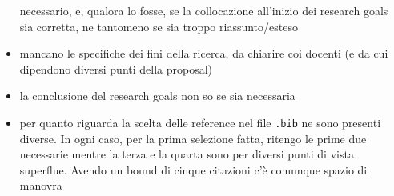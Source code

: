\documentclass[a4paper,11pt, oneside]{article}
\begin{document}
\begin{shaded}
\begin{itemize}
    necessario, e, qualora lo fosse, se la collocazione all'inizio dei research
    goals sia corretta, ne tantomeno se sia troppo riassunto/esteso
    \item mancano le specifiche dei fini della ricerca, da chiarire coi docenti
    (e da cui dipendono diversi punti della proposal)
    \item la conclusione del research goals non so se sia necessaria
    \item per quanto riguarda la scelta delle reference nel file \texttt{.bib}
    ne sono 
    presenti diverse. In ogni caso, per la prima selezione fatta, ritengo le
    prime due necessarie mentre la terza e la quarta sono per diversi punti di
    vista superflue. Avendo un bound di cinque citazioni c'è comunque spazio di
    manovra
  \end{itemize}
\end{shaded}
\end{document}
